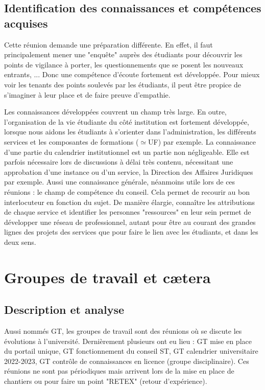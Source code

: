 \documentclass{article}
\begin{document}
\subsection{Identification des connaissances et compétences acquises}
Cette réunion demande une préparation différente. 
En effet, il faut principalement mener une "enquête" auprès des étudiants pour découvrir les points de vigilance à porter, les questionnements que se posent les nouveaux entrants, ... 
Donc une compétence d'écoute fortement est développée. 
Pour mieux voir les tenants des points soulevés par les étudiants, il peut être propice de s'imaginer à leur place et de faire preuve d'empathie. \par 
Les connaissances développées couvrent un champ très large. 
En outre, l'organisation de la vie étudiante du côté institution est fortement développée, lorsque nous aidons les étudiants à s'orienter dans l'administration, les différents services et les composantes de formations ($\simeq$UF) par exemple. 
La connaissance d'une partie du calendrier institutionnel est un partie non négligeable. 
Elle est parfois nécessaire lors de discussions à délai très contenu, nécessitant une approbation d'une instance ou d'un service, la Direction des Affaires Juridiques par exemple.
Aussi une connaissance générale, néanmoins utile lors de ces réunions : le champ de compétence du conseil. 
Cela permet de recourir au bon interlocuteur en fonction du sujet. 
De manière élargie, connaître les attributions de chaque service et identifier les personnes "ressources" en leur sein permet de développer une réseau de professionnel, autant pour être au courant des grandes lignes des projets des services que pour faire le lien avec les étudiants, et dans les deux sens.


\newpage

\section{Groupes de travail et cætera}

\subsection{Description et analyse}
Aussi nommés GT, les groupes de travail sont des réunions où se discute les évolutions à l'université. Dernièrement plusieurs ont eu lieu : GT mise en place du portail unique, GT fonctionnement du conseil ST, GT calendrier  universitaire 2022-2023, GT contrôle de connaissances en licence (groupe disciplinaire). Ces réunions ne sont pas périodiques mais arrivent lors de la mise en place de chantiers ou pour faire un point "RETEX" (retour d'expérience).
\end{document}
